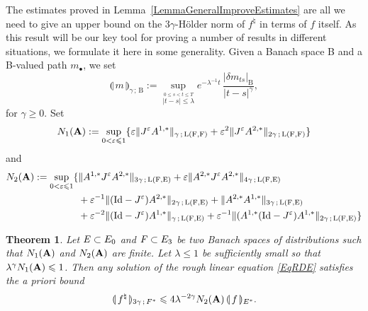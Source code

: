 \documentclass[11pt,a4paper]{amsart}
\renewcommand{\leq}{\leqslant}
\renewcommand{\geq}{\geqslant}
\theoremstyle{plain}%
\newtheorem{theorem}{Theorem}
\theoremstyle{definition}
\theoremstyle{remark}
\numberwithin{equation}{section} %
\begin{document}
The estimates proved in Lemma~\ref{LemmaGeneralImproveEstimates} are all we need to give an upper bound on the $3\gamma$-H\"older norm of $f^\natural$ in terms of $f$ itself. As this result will be our key tool for proving a number of results in different situations, we formulate it here in some generality. Given a Banach space B and a B-valued path $m_\bullet$, we set
$$
\llparenthesis\,m\,\rrparenthesis_{\gamma\,;\,\textrm{B}} := \sup_{\stackrel{0\leq s<t\leq T}{{|t-s|\le \lambda}}}e^{-\lambda^{-1}t}\,\frac{| \delta m_{ts} |_\textrm{B}}{|t-s|^\gamma},
$$
for $\gamma\geq 0$.
 Set 
$$
N_1({\bfA}) := \sup_{0<\varepsilon\leq 1} \{ \varepsilon\| J^\varepsilon A^{1,*}\|_{\gamma\,;\,\textrm{L}(\textrm{F},\textrm{F})} + \varepsilon^2\| J^\varepsilon A^{2,*}\|_{2\gamma\,;\,\textrm{L}(\textrm{F},\textrm{F})} \}
$$ 
and
\begin{equation*}
\begin{split}
N_2({\bfA}) := \sup_{0<\varepsilon\leq 1}  \{ &  \|A^{1,*} J^\varepsilon  A^{2,*}\|_{3\gamma\,;\,\textrm{L}(\textrm{F},\textrm{E})} + \varepsilon \|A^{2,*} J^\varepsilon  A^{2,*}\|_{4\gamma\,;\,\textrm{L}(\textrm{F},\textrm{E})} \\
&+ \varepsilon^{-1}  \|(\textrm{Id} - J^\varepsilon)A^{2,*}\|_{2\gamma\,;\,\textrm{L}(\textrm{F},\textrm{E})} + \|A^{2,*} A^{1,*}\|_{3\gamma\,;\,\textrm{L}(\textrm{F},\textrm{E})} \\
&+ \varepsilon^{-2} \|(\textrm{Id} - J^\varepsilon) A^{1,*}\|_{\gamma\,;\,\textrm{L}(\textrm{F},\textrm{E})} + \varepsilon^{-1}\|(A^{1,*}(\textrm{Id} - J^\varepsilon) A^{1,*}\|_{2\gamma\,;\,\textrm{L}(\textrm{F},\textrm{E})} \}
\end{split}
\end{equation*}

\smallskip

\begin{theorem}
\label{ThmGeneralRegularityGain} 
Let $\textrm{\emph{E}}\subset E_0$ and $\textrm{\emph{F}}\subset E_3$ be two Banach spaces of distributions such that  $N_1({\bf A})$ and $N_2({\bf A})$ are finite. Let  $\lambda \leq 1$ be sufficiently small so that $\lambda^{\gamma} N_1({\bfA}) \leq 1$. Then any solution of the rough linear equation \eqref{EqRDE} satisfies the a priori bound 
$$
\llparenthesis\, f^\natural\,\rrparenthesis_{3\gamma\,;\,F^*} \leq 4 \lambda^{-2\gamma} N_2({\bfA})\,\llparenthesis\,f\,\rrparenthesis_{E^*}. 
$$
\end{theorem}

\smallskip
\end{document}
